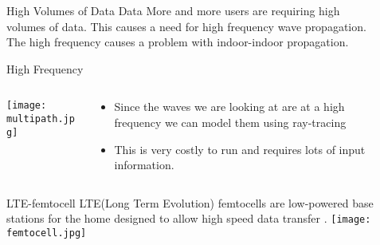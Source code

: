 \documentclass[final]{beamer}
\theoremstyle{plain}
\theoremstyle{definition}
\theoremstyle{remark}
\newlength{\sepwid}
\newlength{\onecolwid}
\newlength{\twocolwid}
\begin{document}
\begin{frame}[t]
\begin{columns}[t]
\begin{column}{\onecolwid}

\end{column} %

\begin{column}{\sepwid}\end{column} %

\begin{column}{\twocolwid} %


\begin{alertblock}{High Volumes of Data Data}
More and more users are requiring high volumes of data. This causes a need for high frequency wave propagation.
\\ 
The high frequency causes a problem with indoor-indoor propagation.
\end{alertblock}

\begin{block}{High Frequency}
\vspace{-2cm}
\begin{columns}
\begin{column}{0.45\linewidth}
\texttt{[image: multipath.jpg]} \cite{Multipath} 
\end{column}
\begin{column}{0.55\linewidth}
\vspace{-1cm}
\begin{itemize}
\item
Since the waves we are looking at are at a high frequency we can model them using ray-tracing
\item This is very costly to run and requires lots of input information.
\end{itemize}
\end{column}
\end{columns}
\end{block}

\begin{alertblock}{LTE-femtocell}
LTE(Long Term Evolution) femtocells are low-powered base stations for the home designed to allow high speed data transfer
\cite{LTEfemtocells, zyren2007overview}.
\centering
\center
\texttt{[image: femtocell.jpg]} \cite{femtocells} 
\end{alertblock}


\end{column}
\end{columns}
\end{frame}
\end{document}
